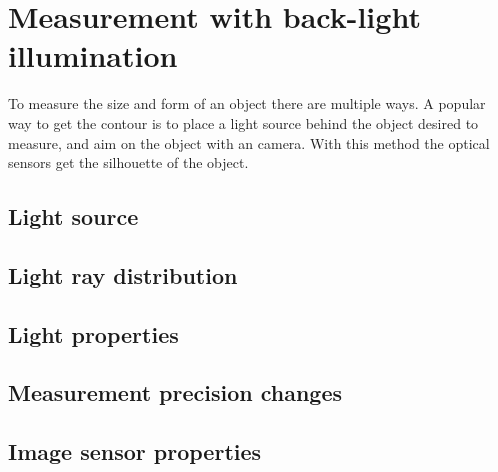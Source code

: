 \section{Measurement with back-light illumination}
To measure the size and form of an object there are multiple ways. A popular way to get the contour is to place a light source behind the object desired to measure, and aim on the object with an camera. With this method the optical sensors get the silhouette of the object. 
\subsection{Light source}
\subsection{Light ray distribution}
\subsection{Light properties}
\subsection{Measurement precision changes}
\subsection{Image sensor properties}

